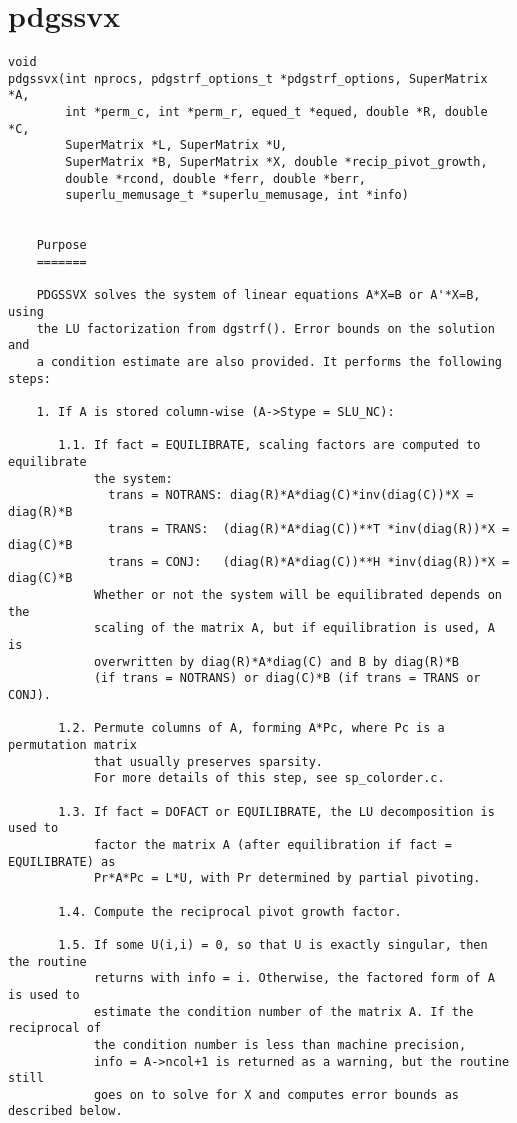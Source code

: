\section{pdgssvx}
\begin{verbatim}
void
pdgssvx(int nprocs, pdgstrf_options_t *pdgstrf_options, SuperMatrix *A, 
        int *perm_c, int *perm_r, equed_t *equed, double *R, double *C,
        SuperMatrix *L, SuperMatrix *U,
        SuperMatrix *B, SuperMatrix *X, double *recip_pivot_growth, 
        double *rcond, double *ferr, double *berr, 
        superlu_memusage_t *superlu_memusage, int *info)


    Purpose
    =======

    PDGSSVX solves the system of linear equations A*X=B or A'*X=B, using
    the LU factorization from dgstrf(). Error bounds on the solution and
    a condition estimate are also provided. It performs the following steps:

    1. If A is stored column-wise (A->Stype = SLU_NC):

       1.1. If fact = EQUILIBRATE, scaling factors are computed to equilibrate
            the system:
              trans = NOTRANS: diag(R)*A*diag(C)*inv(diag(C))*X = diag(R)*B
              trans = TRANS:  (diag(R)*A*diag(C))**T *inv(diag(R))*X = diag(C)*B
              trans = CONJ:   (diag(R)*A*diag(C))**H *inv(diag(R))*X = diag(C)*B
            Whether or not the system will be equilibrated depends on the
            scaling of the matrix A, but if equilibration is used, A is
            overwritten by diag(R)*A*diag(C) and B by diag(R)*B 
            (if trans = NOTRANS) or diag(C)*B (if trans = TRANS or CONJ).

       1.2. Permute columns of A, forming A*Pc, where Pc is a permutation matrix
            that usually preserves sparsity.
            For more details of this step, see sp_colorder.c.

       1.3. If fact = DOFACT or EQUILIBRATE, the LU decomposition is used to 
            factor the matrix A (after equilibration if fact = EQUILIBRATE) as
            Pr*A*Pc = L*U, with Pr determined by partial pivoting.

       1.4. Compute the reciprocal pivot growth factor.

       1.5. If some U(i,i) = 0, so that U is exactly singular, then the routine
            returns with info = i. Otherwise, the factored form of A is used to
            estimate the condition number of the matrix A. If the reciprocal of
            the condition number is less than machine precision, 
            info = A->ncol+1 is returned as a warning, but the routine still
            goes on to solve for X and computes error bounds as described below.


\end{verbatim}
